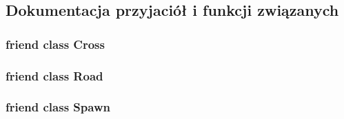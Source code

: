 \subsection{Dokumentacja przyjaciół i funkcji związanych}
\hypertarget{class_scene_ace3ec366f47be67a97ce4c94dfa569fd}{
\subsubsection[{Cross}]{\setlength{\rightskip}{0pt plus 5cm}friend class {\bf Cross}\hspace{0.3cm}{\ttfamily [friend]}}}\label{class_scene_ace3ec366f47be67a97ce4c94dfa569fd}
\hypertarget{class_scene_a1fbbe65f53589c2d26f43a3635f2f8a3}{
\subsubsection[{Road}]{\setlength{\rightskip}{0pt plus 5cm}friend class {\bf Road}\hspace{0.3cm}{\ttfamily [friend]}}}\label{class_scene_a1fbbe65f53589c2d26f43a3635f2f8a3}
\hypertarget{class_scene_a6c5d0923647f9e8875e27eb17f8ea8a5}{
\subsubsection[{Spawn}]{\setlength{\rightskip}{0pt plus 5cm}friend class {\bf Spawn}\hspace{0.3cm}{\ttfamily [friend]}}}\label{class_scene_a6c5d0923647f9e8875e27eb17f8ea8a5}



